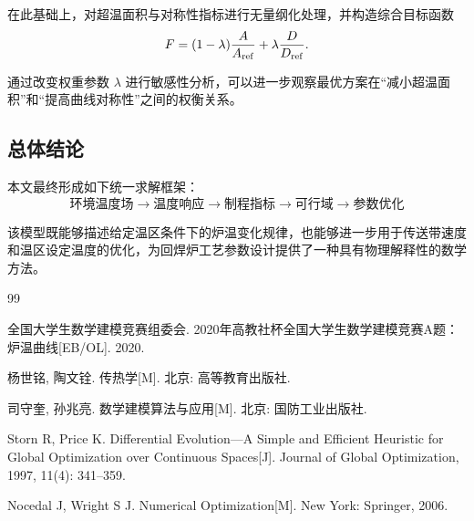 \documentclass{cumcmthesis}
\begin{document}
在此基础上，对超温面积与对称性指标进行无量纲化处理，并构造综合目标函数
\[
F
=
(1-\lambda)
\frac{A}{A_{\rm ref}}
+
\lambda
\frac{D}{D_{\rm ref}}.
\]

通过改变权重参数 $\lambda$ 进行敏感性分析，可以进一步观察最优方案在“减小超温面积”和“提高曲线对称性”之间的权衡关系。

\subsection{总体结论}

本文最终形成如下统一求解框架：
\[
\boxed{
\text{环境温度场}
\rightarrow
\text{温度响应}
\rightarrow
\text{制程指标}
\rightarrow
\text{可行域}
\rightarrow
\text{参数优化}
}
\]

该模型既能够描述给定温区条件下的炉温变化规律，也能够进一步用于传送带速度和温区设定温度的优化，为回焊炉工艺参数设计提供了一种具有物理解释性的数学方法。



\begin{thebibliography}{99}

全国大学生数学建模竞赛组委会.
2020年高教社杯全国大学生数学建模竞赛A题：炉温曲线[EB/OL].
2020.

杨世铭, 陶文铨.
传热学[M].
北京: 高等教育出版社.

司守奎, 孙兆亮.
数学建模算法与应用[M].
北京: 国防工业出版社.

Storn R, Price K.
Differential Evolution---A Simple and Efficient Heuristic for Global Optimization over Continuous Spaces[J].
Journal of Global Optimization, 1997, 11(4): 341--359.

Nocedal J, Wright S J.
Numerical Optimization[M].
New York: Springer, 2006.

\end{thebibliography}


\end{document}
